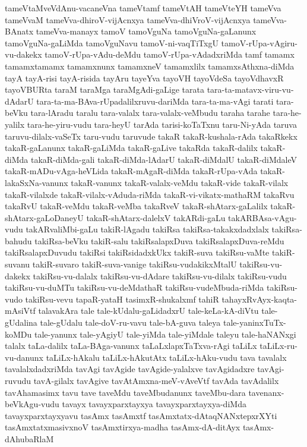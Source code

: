 {tameVtaMveVdAnu-vacaneVna
tameVtamf
tameVtAH
tameVteYH
tameVva
tameVvaM
tameVva-dhiroV-vijAcnxya
tameVva-dhiVroV-vijAcnxya
tameVva-BAnatx
tameVva-manayx
tamoV
tamoVguNa
tamoVguNa-gaLanunx
tamoVguNa-gaLiMda
tamoVguNavu
tamoV-ni-vaqTiTxgU
tamoV-rUpa-vAgiru-vu-dakekx
tamoV-rUpa-vAdu-deMdu
tamoV-rUpa-vAdadxriMda
tamf
tamamx
tamamxtamamx
tamamxnunx
tamamxneV
tamamxlilx
tamamxsAthxna-diMda
tayA
tayA-risi
tayA-risida
tayAru
tayeYva
tayoVH
tayoVdeSa
tayoVdhavxR
tayoVBURta
taraM
taraMga
taraMgAdi-gaLige
tarata
tara-ta-matavx-viru-vu-dAdarU
tara-ta-ma-BAva-rUpadalilxruvu-dariMda
tara-ta-ma-vAgi
tarati
tara-beVku
tara-lAradu
taralu
tara-valalx
tara-valalx-veMbudu
taraha
tarahe
tara-he-yalilx
tara-he-yiru-vudu
tara-heyU
tarAda
tarisi-koTaTxnu
taru-Ni-yAda
taruva
taruvu-dilalx-vaSeTx
taru-vudu
taruvude
takaR
takaR-kushala-rAda
takaRkekx
takaR-gaLanunx
takaR-gaLiMda
takaR-gaLive
takaRda
takaR-dalilx
takaR-diMda
takaR-diMda-gali
takaR-diMda-lAdarU
takaR-diMdalU
takaR-diMdaleV
takaR-mADu-vAga-heVLida
takaR-mAgaR-diMda
takaR-rUpa-vAda
takaR-lakaSxNa-vanunx
takaR-vanunx
takaR-valalx-veMdu
takaR-vide
takaR-vilalx
takaR-vilalxde
takaR-vilalx-vAduda-riMda
takaR-vi-vikatx-mathaRM
takaRvu
takaRvU
takaR-veMdu
takaR-veMba
takaRveV
takaR-shAtarx-gaLalilx
takaR-shAtarx-gaLoDaneyU
takaR-shAtarx-dalelxV
takARdi-gaLu
takARBAsa-vAgu-vudu
takARvaliMbi-gaLu
takiR-lAgadu
takiRsa
takiRsa-takakxdadxlalx
takiRsa-bahudu
takiRsa-beVku
takiR-salu
takiRsalapxDuva
takiRsalapxDuva-reMdu
takiRsalapxDuvudu
takiRsi
takiRsidadxkUkx
takiR-suva
takiRsu-vaMte
takiR-suvanu
takiR-suvaro
takiR-suva-vanige
takiRsu-vudakikxMtalU
takiRsu-vu-dakekx
takiRsu-vu-dalalx
takiRsu-vu-dAdare
takiRsu-vu-dilalx
takiRsu-vudu
takiRsu-vu-duMTu
takiRsu-vu-deMdathaR
takiRsu-vudeMbuda-riMda
takiRsu-vudo
takiRsu-vevu
tapaR-yataH
tasimxR-shukalxmf
tahiR
tahayxRvAyx-kaqta-mAsiVtf
talavakAra
tale
tale-kUdalu-gaLidadxrU
tale-keLa-kA-diVtu
tale-gUdalina
tale-gUdalu
tale-doV-ru-vavu
tale-bA-guva
taleya
tale-yaninxTuTx-koMDu
tale-yanunx
tale-yAgiyU
tale-yiMda
tale-yiMdale
taleyu
tale-haNANxgi
talalx
taLa-dalilx
taLa-BAga-vanunx
taLaLxlapxTaTxva-rAgi
taLiLx
taLiLx-ru-vu-danunx
taLiLx-hAkalu
taLiLx-hAkutAtx
taLiLx-hAku-vudu
tava
tavalalx
tavalalxdadxriMda
tavAgi
tavAgide
tavAgide-yalalxve
tavAgidadxre
tavAgi-ruvudu
tavA-gilalx
tavAgive
tavAtAmxna-meV-vAveVtf
tavAda
tavAdalilx
tavAhamasimx
tavu
tave
taveMdu
taveMbudanunx
taveMbu-dara
tavenanx-beVkAgu-vudu
tavayx
tavayxparxtayxya
tavayxparxtayxya-diMda
tavayxparxtayxyavu
tasAmx
tasAmxtf
tasAmxtatx-dAtaqNANxtepxrXYti
tasAmxtatxmasivxnoV
tasAmxtirxya-madha
tasAmx-dA-ditAyx
tasAmx-dAhubaRlaM
}
